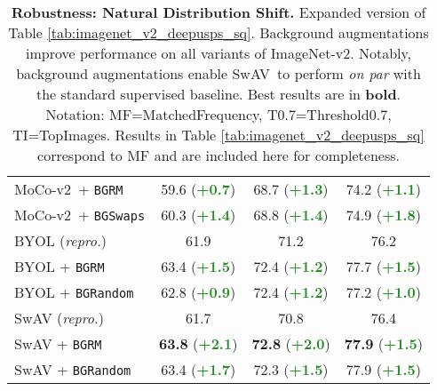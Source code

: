 \documentclass[twoside,11pt]{article}
\newcommand{\bgrm}{\texttt{BG\textunderscore RM}}
\newcommand{\bgswaps}{\texttt{BG\textunderscore Swaps}}
\newcommand{\bgrand}{\texttt{BG\textunderscore Random}}
\newcommand{\moco}{MoCo-v2}
\newcommand{\swav}{SwAV}
\begin{document}
\begin{table}
\begin{tabular}{lccc}
    \moco~+ \bgrm 
    & 59.6 (\textbf{\textcolor{ForestGreen}{+0.7}}) & 68.7 (\textbf{\textcolor{ForestGreen}{+1.3}}) 
    & 74.2 (\textbf{\textcolor{ForestGreen}{+1.1}}) \\
    \moco~+ \bgswaps 
    & 60.3 (\textbf{\textcolor{ForestGreen}{+1.4}}) & 68.8 (\textbf{\textcolor{ForestGreen}{+1.4}}) 
    & 74.9 (\textbf{\textcolor{ForestGreen}{+1.8}}) \\
    BYOL {\scriptsize{(\textit{repro.})}} & 61.9 & 71.2 & 76.2\\
    BYOL + \bgrm & 63.4 (\textbf{\textcolor{ForestGreen}{+1.5}}) & 72.4  (\textbf{\textcolor{ForestGreen}{+1.2}})& 77.7 (\textbf{\textcolor{ForestGreen}{+1.5}})   \\
    BYOL + \bgrand & 62.8 (\textbf{\textcolor{ForestGreen}{+0.9}}) & 72.4 (\textbf{\textcolor{ForestGreen}{+1.2}}) & 77.2 (\textbf{\textcolor{ForestGreen}{+1.0}})   \\
    SwAV {\scriptsize{(\textit{repro.})}} & 61.7 & 70.8 & 76.4 \\
    SwAV + \bgrm  & \textbf{63.8} (\textbf{\textcolor{ForestGreen}{+2.1}}) & \textbf{72.8} (\textbf{\textcolor{ForestGreen}{+2.0}}) & \textbf{77.9} (\textbf{\textcolor{ForestGreen}{+1.5}}) \\
    SwAV + \bgrand  & 63.4 (\textbf{\textcolor{ForestGreen}{+1.7}}) & 72.3 (\textbf{\textcolor{ForestGreen}{+1.5}}) & 77.9 (\textbf{\textcolor{ForestGreen}{+1.5}})  \\
    \bottomrule
    \end{tabular}
    \caption{
    \textbf{Robustness: Natural Distribution Shift.} Expanded version of Table \ref{tab:imagenet_v2_deepusps_sq}.  Background augmentations improve performance on all variants of ImageNet-v2. Notably, background augmentations enable \swav~to perform \textit{on par} with the standard supervised baseline. Best results are in \textbf{bold}. Notation: MF=MatchedFrequency, T0.7=Threshold0.7, TI=TopImages. Results in Table \ref{tab:imagenet_v2_deepusps_sq} correspond to MF and are included here for completeness.
    }
    \label{tab:expanded_imnetv2_deepusps_sq}
\end{table}
\end{document}
